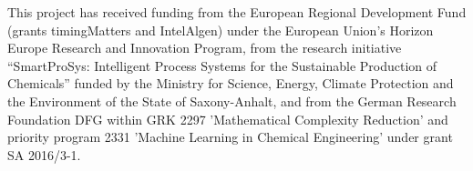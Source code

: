 \begin{acknowledgements}
This project has received funding from the European Regional Development Fund (grants timingMatters and IntelAlgen) under the European Union’s Horizon Europe Research and Innovation Program, 
from the research initiative ``SmartProSys: Intelligent Process Systems for the Sustainable Production of Chemicals'' funded by the Ministry for Science, Energy, Climate Protection and the Environment of the State of Saxony-Anhalt, and
from the German Research Foundation DFG within GRK 2297 ’Mathematical Complexity Reduction’ and priority program 2331 ’Machine Learning in Chemical Engineering’ under grant SA 2016/3-1.
\end{acknowledgements}

